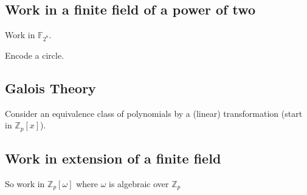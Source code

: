 \documentclass{amsart}
\newcommand{\Z}{\mathbb{Z}}
\newcommand{\F}{\mathbb{F}}
\begin{document}
\subsection*{Work in a finite field of a power of two}

Work in $\F_{2^8}$.

Encode a circle.


\subsection*{Galois Theory}

Consider an equivalence class of polynomials by a (linear) transformation (start in $\Z_p[x]$).



\subsection*{Work in extension of a finite field}

So work in $\Z_p[\omega]$ where $\omega$ is algebraic over $\Z_p$
\end{document}

